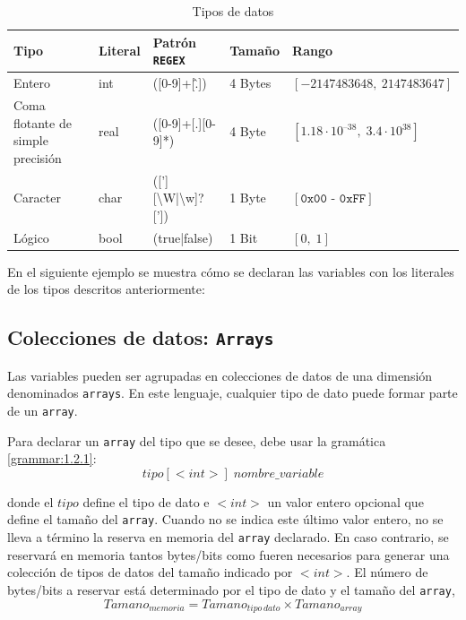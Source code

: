 \documentclass[11pt, english]{article}
\begin{document}
\begin{table}[H]
	\begin{center}
		\caption{Tipos de datos}
		\label{tab:table1}
		\begin{tabular}{l|l|l|l|l}
			\toprule
			\textbf{Tipo} & \textbf{Literal} & \textbf{Patrón \texttt{REGEX}} & \textbf{Tamaño} & \textbf{Rango}\\
			\midrule
			Entero & int & ([0-9]+[\^.]) & 4 Bytes & $\left [-2147483648,\: 2147483647 \right]$\\
			Coma flotante de simple precisión & real & ([0-9]+[.][0-9]*) & 4 Byte & $\left [ 1.18 \cdot 10^{–38},\; 3.4 \cdot 10^{38} \right ]$\\
			Caracter & char & (['][\textbackslash W|\textbackslash w]?[']) & 1 Byte & $\left [ \texttt{0x00 - 0xFF} \right ]$\\
			Lógico & bool & (true|false)  & 1 Bit & $\left [0,\; 1 \right ]$\\
			\bottomrule
		\end{tabular}
	\end{center}
\end{table}

En el siguiente ejemplo se muestra cómo se declaran las variables con los literales de los tipos descritos anteriormente:



\subsection{Colecciones de datos: \texttt{Arrays}}\label{arrays}
Las variables pueden ser agrupadas en colecciones de datos de una dimensión denominados \texttt{arrays}. En este lenguaje, cualquier tipo de dato puede formar parte de un \texttt{array}.

Para declarar un \texttt{array} del tipo que se desee, debe usar la gramática \ref{grammar:1.2.1}:
	\begin{equation}\label{grammar:1.2.1}
		tipo[<int>]\; nombre\_variable
	\end{equation}

donde el $tipo$ define el tipo de dato e $<int>$ un valor entero opcional que define el tamaño del \texttt{array}. Cuando no se indica este último valor entero, no se lleva a término la reserva en memoria del \texttt{array} declarado. En caso contrario, se reservará en memoria tantos bytes/bits como fueren necesarios para generar una colección de tipos de datos del tamaño indicado por $<int>$. El número de bytes/bits a reservar está determinado por el tipo de dato y el tamaño del \texttt{array},
	\begin{equation}\label{eq:1.2}
		Tamano_{memoria} = Tamano_{tipo\, dato} \times Tamano_{array}
	\end{equation}
\end{document}
